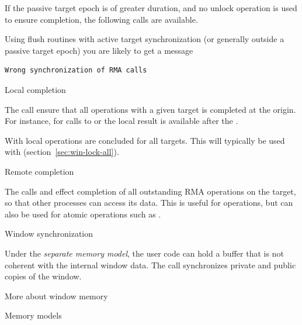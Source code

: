 If the passive target epoch is of greater duration,
and no unlock operation is used to ensure completion,
the following calls are available.

\begin{remark}
  Using flush routines with active target synchronization
  (or generally outside a passive target epoch) you are
  likely to get a message
\begin{verbatim}
Wrong synchronization of RMA calls
\end{verbatim}
\end{remark}

 {Local completion}

The call  
ensure that all operations with a given target is completed at the origin.
For instance, for calls to  or
 the local result is available after
the .

With  local operations are
concluded for all targets. This will typically be used
with  (section~\ref{sec:win-lock-all}).

 {Remote completion}

The calls
 and
effect completion of all outstanding \ac{RMA} operations
on the target, so that
other processes can access its data.
This is useful for  operations,
but can also be used for atomic operations
such as .

 {Window synchronization}

Under the
\emph{separate memory model},
the user code can hold a buffer that is not coherent with the internal
window data. The call  synchronizes
private and public copies of the window.

 {More about window memory}

 {Memory models}
\label{sec:win-model}

